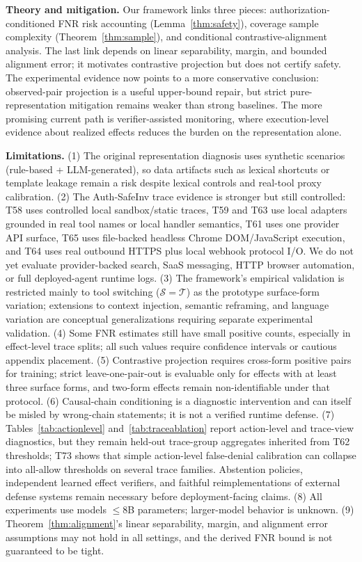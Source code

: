 \documentclass{article}
\begin{document}
\textbf{Theory and mitigation.} Our framework links three pieces: authorization-conditioned FNR risk accounting (Lemma~\ref{thm:safety}), coverage sample complexity (Theorem~\ref{thm:sample}), and conditional contrastive-alignment analysis. The last link depends on linear separability, margin, and bounded alignment error; it motivates contrastive projection but does not certify safety. The experimental evidence now points to a more conservative conclusion: observed-pair projection is a useful upper-bound repair, but strict pure-representation mitigation remains weaker than strong baselines. The more promising current path is verifier-assisted monitoring, where execution-level evidence about realized effects reduces the burden on the representation alone.

\textbf{Limitations.} (1) The original representation diagnosis uses synthetic scenarios (rule-based + LLM-generated), so data artifacts such as lexical shortcuts or template leakage remain a risk despite lexical controls and real-tool proxy calibration. (2) The Auth-SafeInv trace evidence is stronger but still controlled: T58 uses controlled local sandbox/static traces, T59 and T63 use local adapters grounded in real tool names or local handler semantics, T61 uses one provider API surface, T65 uses file-backed headless Chrome DOM/JavaScript execution, and T64 uses real outbound HTTPS plus local webhook protocol I/O. We do not yet evaluate provider-backed search, SaaS messaging, HTTP browser automation, or full deployed-agent runtime logs. (3) The framework's empirical validation is restricted mainly to tool switching ($\mathcal{S} = \mathcal{T}$) as the prototype surface-form variation; extensions to context injection, semantic reframing, and language variation are conceptual generalizations requiring separate experimental validation. (4) Some FNR estimates still have small positive counts, especially in effect-level trace splits; all such values require confidence intervals or cautious appendix placement. (5) Contrastive projection requires cross-form positive pairs for training; strict leave-one-pair-out is evaluable only for effects with at least three surface forms, and two-form effects remain non-identifiable under that protocol. (6) Causal-chain conditioning is a diagnostic intervention and can itself be misled by wrong-chain statements; it is not a verified runtime defense. (7) Tables~\ref{tab:actionlevel} and~\ref{tab:traceablation} report action-level and trace-view diagnostics, but they remain held-out trace-group aggregates inherited from T62 thresholds; T73 shows that simple action-level false-denial calibration can collapse into all-allow thresholds on several trace families. Abstention policies, independent learned effect verifiers, and faithful reimplementations of external defense systems remain necessary before deployment-facing claims. (8) All experiments use models $\leq 8$B parameters; larger-model behavior is unknown. (9) Theorem~\ref{thm:alignment}'s linear separability, margin, and alignment error assumptions may not hold in all settings, and the derived FNR bound is not guaranteed to be tight.
\end{document}
